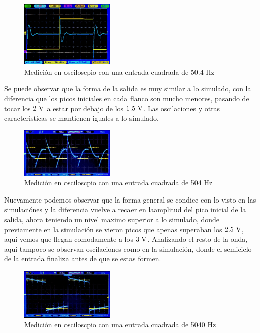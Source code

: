 \begin{centering}
	\begin{figure}[hbt]
		\centering
		\includegraphics[width=0.4\textwidth]{imagenes/Captura50.JPG}
		\caption{Medici\'on en osciloscpio con una entrada cuadrada de 50.4 Hz}
	\end{figure}
\end{centering}

Se puede observar que la forma de la salida es muy similar a lo simulado, con la diferencia que los picos iniciales en cada flanco son mucho menores, pasando de tocar los $2\ \si{\volt}$ a estar por debajo de los $1.5\ \si{\volt}$. Las oscilaciones y otras caracteristicas se mantienen iguales a lo simulado.

\begin{centering}
	\begin{figure}[hbt]
		\centering
		\includegraphics[width=0.4\textwidth]{imagenes/Captura500.JPG}
		\caption{Medici\'on en osciloscpio con una entrada cuadrada de 504 Hz}
	\end{figure}
\end{centering}

Nuevamente podemos observar que la forma  general se condice con lo visto en las simulaci\'ones y la diferencia vuelve a recaer en laamplitud del pico inicial de la salida, ahora teniendo un nivel maximo superior a lo simulado, donde previamente en la simulaci\'on se vieron picos que apenas superaban los $2.5 \ \si{\volt}$, aqui vemos que llegan comodamente a los $3 \ \si{\volt}$. Analizando el resto de la onda, aqui tampoco se observan oscilaciones como en la simulaci\'on,  donde el semiciclo de la entrada finaliza antes de que se estas formen.

\begin{centering}
	\begin{figure}[hbt]
		\centering
		\includegraphics[width=0.4\textwidth]{imagenes/Captura5000.JPG}
		\caption{Medici\'on en osciloscpio con una entrada cuadrada de 5040 Hz}
	\end{figure}
\end{centering}

